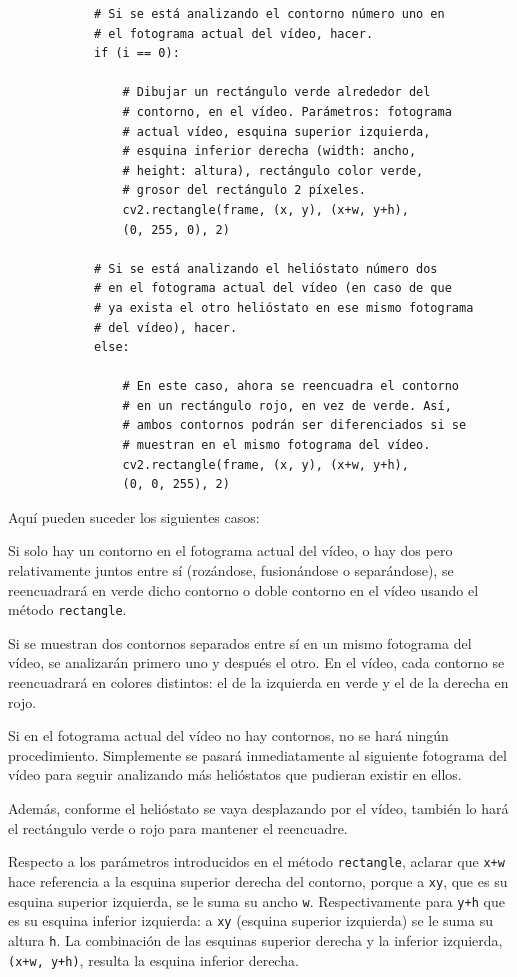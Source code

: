 \begin{lstlisting}
            # Si se está analizando el contorno número uno en
            # el fotograma actual del vídeo, hacer.
            if (i == 0):

                # Dibujar un rectángulo verde alrededor del
                # contorno, en el vídeo. Parámetros: fotograma
                # actual vídeo, esquina superior izquierda,
                # esquina inferior derecha (width: ancho,
                # height: altura), rectángulo color verde,
                # grosor del rectángulo 2 píxeles.
                cv2.rectangle(frame, (x, y), (x+w, y+h),
                (0, 255, 0), 2)

            # Si se está analizando el helióstato número dos
            # en el fotograma actual del vídeo (en caso de que
            # ya exista el otro helióstato en ese mismo fotograma
            # del vídeo), hacer.
            else:

                # En este caso, ahora se reencuadra el contorno
                # en un rectángulo rojo, en vez de verde. Así,
                # ambos contornos podrán ser diferenciados si se
                # muestran en el mismo fotograma del vídeo.
                cv2.rectangle(frame, (x, y), (x+w, y+h),
                (0, 0, 255), 2)
\end{lstlisting}

Aquí pueden suceder los siguientes casos:

Si solo hay un contorno en el fotograma actual del vídeo, o hay dos pero relativamente juntos entre sí (rozándose, fusionándose o separándose), se reencuadrará en verde dicho contorno o doble contorno en el vídeo usando el método \verb|rectangle|.

Si se muestran dos contornos separados entre sí en un mismo fotograma del vídeo, se analizarán primero uno y después el otro. En el vídeo, cada contorno se reencuadrará en colores distintos: el de la izquierda en verde y el de la derecha en rojo.

Si en el fotograma actual del vídeo no hay contornos, no se hará ningún procedimiento. Simplemente se pasará inmediatamente al siguiente fotograma del vídeo para seguir analizando más helióstatos que pudieran existir en ellos.

Además, conforme el helióstato se vaya desplazando por el vídeo, también lo hará el rectángulo verde o rojo para mantener el reencuadre.

Respecto a los parámetros introducidos en el método \verb|rectangle|, aclarar que \verb|x+w| hace referencia a la esquina superior derecha del contorno, porque a \verb|xy|, que es su esquina superior izquierda, se le suma su ancho \verb|w|. Respectivamente para \verb|y+h| que es su esquina inferior izquierda: a \verb|xy| (esquina superior izquierda) se le suma su altura \verb|h|. La combinación de las esquinas superior derecha y la inferior izquierda, \verb|(x+w, y+h)|, resulta la esquina inferior derecha.\\[20pt]

